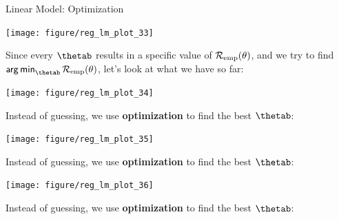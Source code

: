 \documentclass[11pt,compress,t,notes=noshow, xcolor=table]{beamer}
\newenvironment{knitrout}{}{} %
\begin{document}
\begin{vbframe}{Linear Model: Optimization}
\begin{knitrout}\scriptsize
{}\color{fgcolor}

{\centering \texttt{[image: figure/reg\_lm\_plot\_33]} 

}



\end{knitrout}


\framebreak


Since every $\thetab$ results in a specific value of $\mathcal{R}_{\text{emp}}(\theta)$, and we try
to find $\argmin_{\thetab} \risket$, let's look at what we have so far:

\lz

\begin{knitrout}\scriptsize
{}\color{fgcolor}

{\centering \texttt{[image: figure/reg\_lm\_plot\_34]} 

}



\end{knitrout}

\framebreak

Instead of guessing, we use \textbf{optimization} to find the best $\thetab$:
\begin{knitrout}\scriptsize
{}\color{fgcolor}

{\centering \texttt{[image: figure/reg\_lm\_plot\_35]} 

}



\end{knitrout}

\framebreak

Instead of guessing, we use \textbf{optimization} to find the best $\thetab$:
\begin{knitrout}\scriptsize
{}\color{fgcolor}

{\centering \texttt{[image: figure/reg\_lm\_plot\_36]} 

}



\end{knitrout}

\framebreak

Instead of guessing, we use \textbf{optimization} to find the best $\thetab$:

\begin{knitrout}\scriptsize
{}\color{fgcolor}


\end{knitrout}
\end{vbframe}
\end{document}
